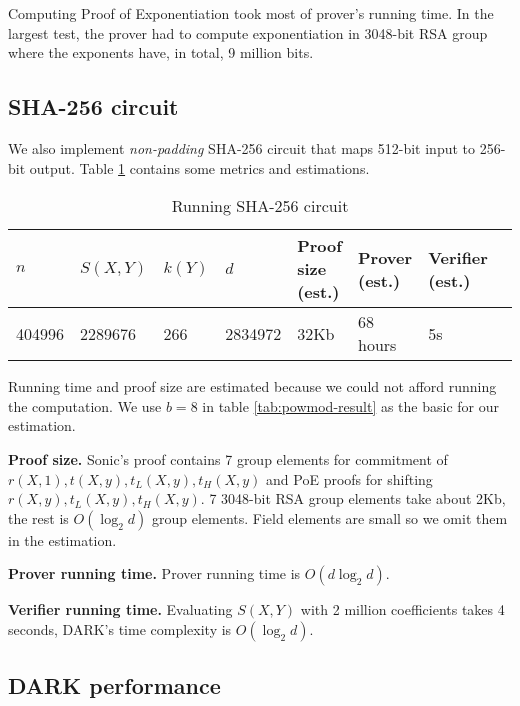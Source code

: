 Computing Proof of Exponentiation took most of prover's running time. In the largest test, the prover had to compute exponentiation in 3048-bit RSA group where the exponents have, in total, 9 million bits.

\subsection{SHA-256 circuit}

We also implement \textit{non-padding} SHA-256 circuit that maps 512-bit input to 256-bit output. Table \ref{tab:sha256-result} contains some metrics and estimations.

\begin{table}[!htp]
\centering
\begin{tabular}{|l|l|l|l|l|l|l|l|}
\hline
$n$    & $S(X, Y)$     & $k(Y)$    & $d$      & Proof size (est.) & Prover (est.) & Verifier (est.) \\ \hline
404996 & 2289676       &  266      & 2834972  & 32Kb       & 68 hours    & 5s    \\ \hline
\end{tabular}
\caption{Running SHA-256 circuit}
\label{tab:sha256-result}
\end{table}

Running time and proof size are estimated because we could not afford running the computation. We use $b = 8$ in table \ref{tab:powmod-result} as the basic for our estimation.

\textbf{Proof size.} Sonic's proof contains 7 group elements for commitment of $r(X, 1), t(X, y), t_L(X, y), t_H(X, y)$ and PoE proofs for shifting $r(X, y), t_L(X, y), t_H(X, y)$. 7 3048-bit RSA group elements take about 2Kb, the rest is $O(\log_2 d)$ group elements. Field elements are small so we omit them in the estimation.

\textbf{Prover running time.} Prover running time is $O(d \log_2 d)$.

\textbf{Verifier running time.} Evaluating $S(X, Y)$ with 2 million coefficients takes 4 seconds, DARK's time complexity is $O(\log_2 d)$.

\subsection{DARK performance}

